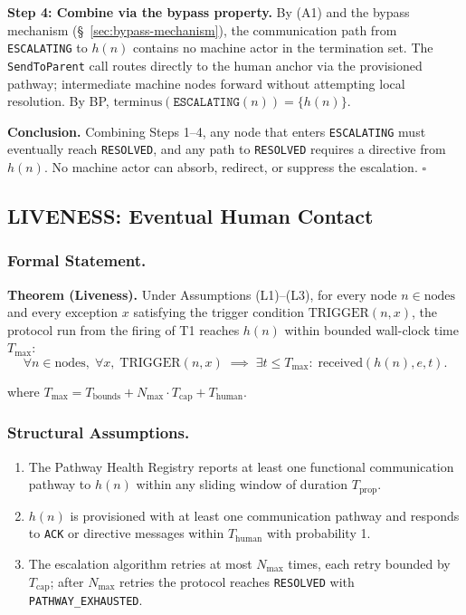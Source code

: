 \medskip
\noindent\textbf{Step 4: Combine via the bypass property.} By (A1) and the bypass mechanism (\S~\ref{sec:bypass-mechanism}), the communication path from \texttt{ESCALATING} to $h(n)$ contains no machine actor in the termination set. The \texttt{SendToParent} call routes directly to the human anchor via the provisioned pathway; intermediate machine nodes forward without attempting local resolution. By BP, $\text{terminus}(\texttt{ESCALATING}(n)) = \{h(n)\}$.

\medskip
\noindent\textbf{Conclusion.} Combining Steps 1--4, any node that enters \texttt{ESCALATING} must eventually reach \texttt{RESOLVED}, and any path to \texttt{RESOLVED} requires a directive from $h(n)$. No machine actor can absorb, redirect, or suppress the escalation. $\square$

\subsection{LIVENESS: Eventual Human Contact}

\subsubsection{Formal Statement.}

\begin{bluebox}
\textbf{Theorem (Liveness).} Under Assumptions (L1)--(L3), for every node $n \in \text{nodes}$ and every exception $x$ satisfying the trigger condition $\text{TRIGGER}(n, x)$, the protocol run from the firing of T1 reaches $h(n)$ within bounded wall-clock time $T_{\max}$:
\[
\forall n \in \text{nodes},\; \forall x,\; \text{TRIGGER}(n, x) \; \implies \; \exists t \leq T_{\max}:\; \text{received}(h(n), e, t).
\tag{LIVENESS}
\]

where $T_{\max} = T_{\text{bounds}} + N_{\max} \cdot T_{\text{cap}} + T_{\text{human}}$.
\end{bluebox}

\subsubsection{Structural Assumptions.}

\begin{enumerate}
\item[(L1)] The Pathway Health Registry reports at least one functional communication pathway to $h(n)$ within any sliding window of duration $T_{\text{prop}}$.
\item[(L2)] $h(n)$ is provisioned with at least one communication pathway and responds to \texttt{ACK} or directive messages within $T_{\text{human}}$ with probability 1.
\item[(L3)] The escalation algorithm retries at most $N_{\max}$ times, each retry bounded by $T_{\text{cap}}$; after $N_{\max}$ retries the protocol reaches \texttt{RESOLVED} with \texttt{PATHWAY\_EXHAUSTED}.
\end{enumerate}

